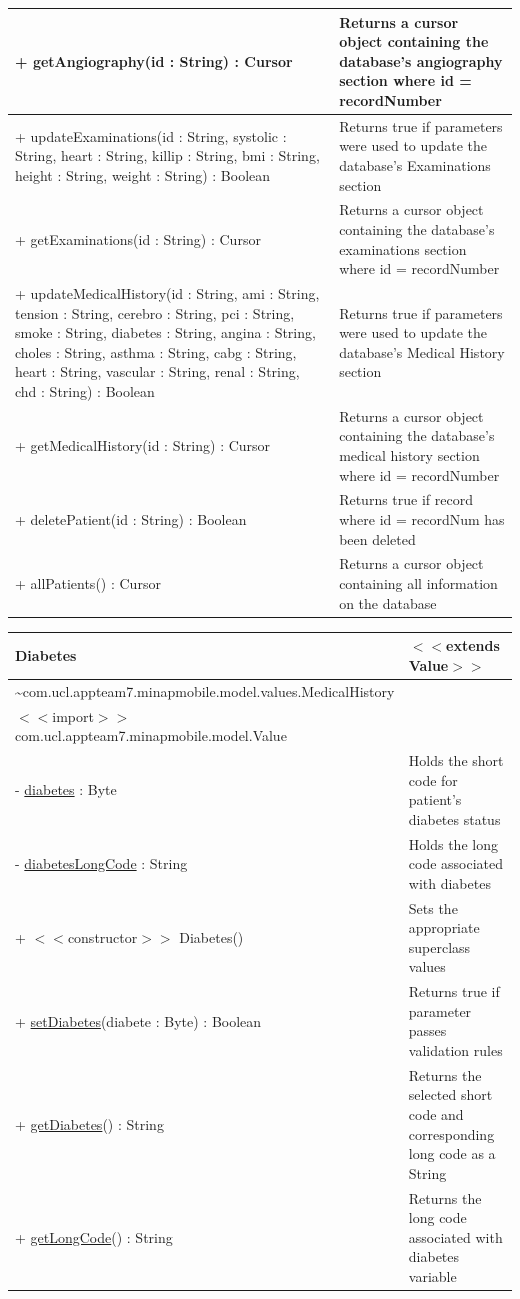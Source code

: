 \documentclass[12pt,a4paper,oneside,titlepage]{article}
\begin{document}
\begin{center}
	\begin{tabular}{| p{13cm} | p{5cm} |}
	\hline	
	+ getAngiography(id : String) : Cursor & Returns a cursor object containing the database's angiography section where id = recordNumber \\ \hline
	+ updateExaminations(id : String, systolic : String, heart : String, killip : String, bmi : String, height : String, weight : String) : Boolean & Returns true if parameters were used to update the database's Examinations section \\ \hline
	+ getExaminations(id : String) : Cursor & Returns a cursor object containing the database's examinations section where id = recordNumber \\ \hline
	+ updateMedicalHistory(id : String, ami : String, tension : String, cerebro : String, pci : String, smoke : String, diabetes : String, angina : String, choles : String, asthma : String, cabg : String, heart : String, vascular : String, renal : String, chd : String) : Boolean & Returns true if parameters were used to update the database's Medical History section \\ \hline
	+ getMedicalHistory(id : String) : Cursor & Returns a cursor object containing the database's medical history section where id = recordNumber \\ \hline
	+ deletePatient(id : String) : Boolean & Returns true if record where id = recordNum has been deleted \\ \hline
	+ allPatients() : Cursor & Returns a cursor object containing all information on the database \\ \hline
	\end{tabular}
\end{center}

\begin{center}
	\begin{tabular}{| p{13cm} | p{5cm} |}
	\hline
	\textbf{Diabetes} & \textbf{$<<$extends Value$>>$} \\ \hline
	\textasciitilde com.ucl.appteam7.minapmobile.model.values.MedicalHistory & \\ \hline
	$<<$import$>>$ com.ucl.appteam7.minapmobile.model.Value & \\ \hline \hline
	- \underline{diabetes} : Byte & Holds the short code for patient's diabetes status \\ \hline
	- \underline{diabetesLongCode} : String & Holds the long code associated with diabetes \\ \hline \hline
	+ $<<$constructor$>>$ Diabetes() & Sets the appropriate superclass values \\ \hline
	+ \underline{setDiabetes}(diabete : Byte) : Boolean & Returns true if parameter passes validation rules \\ \hline
	+ \underline{getDiabetes}() : String & Returns the selected short code and corresponding long code as a String \\ \hline
	+ \underline{getLongCode}() : String & Returns the long code associated with diabetes variable \\ \hline
	\end{tabular}
\end{center}
\end{document}
